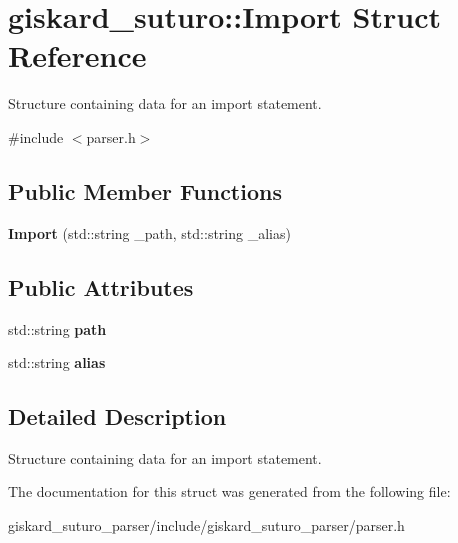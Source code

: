 \hypertarget{structgiskard__suturo_1_1Import}{\section{giskard\-\_\-suturo\-:\-:Import Struct Reference}
\label{structgiskard__suturo_1_1Import}
}


Structure containing data for an import statement.  




{\ttfamily \#include $<$parser.\-h$>$}

\subsection*{Public Member Functions}
\begin{DoxyCompactItemize}
\item 
\hypertarget{structgiskard__suturo_1_1Import_a331e7e551fe8dd31a0d38fef460c6107}{{\bfseries Import} (std\-::string \-\_\-path, std\-::string \-\_\-alias)}\label{structgiskard__suturo_1_1Import_a331e7e551fe8dd31a0d38fef460c6107}

\end{DoxyCompactItemize}
\subsection*{Public Attributes}
\begin{DoxyCompactItemize}
\item 
\hypertarget{structgiskard__suturo_1_1Import_ada2ae196639b17dc741a69a3b2314625}{std\-::string {\bfseries path}}\label{structgiskard__suturo_1_1Import_ada2ae196639b17dc741a69a3b2314625}

\item 
\hypertarget{structgiskard__suturo_1_1Import_a207c71abbf80e5042adb8306e5d5f70c}{std\-::string {\bfseries alias}}\label{structgiskard__suturo_1_1Import_a207c71abbf80e5042adb8306e5d5f70c}

\end{DoxyCompactItemize}


\subsection{Detailed Description}
Structure containing data for an import statement. 

The documentation for this struct was generated from the following file\-:\begin{DoxyCompactItemize}
\item 
giskard\-\_\-suturo\-\_\-parser/include/giskard\-\_\-suturo\-\_\-parser/parser.\-h\end{DoxyCompactItemize}
